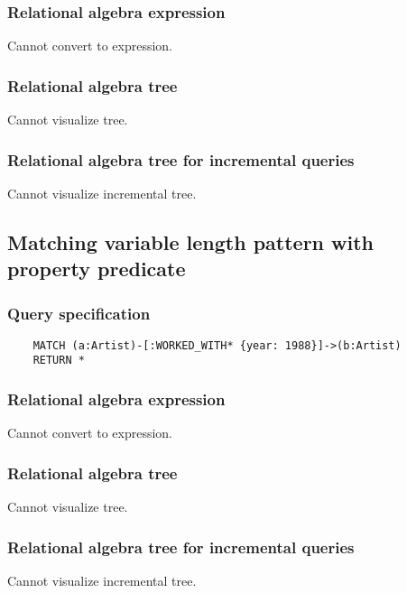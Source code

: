 	\subsubsection*{Relational algebra expression}

	Cannot convert to expression.

	\subsubsection*{Relational algebra tree}

	Cannot visualize tree.

	\subsubsection*{Relational algebra tree for incremental queries}

	Cannot visualize incremental tree.
	\subsection{Matching variable length pattern with property predicate}

	\subsubsection*{Query specification}

	\begin{lstlisting}
	MATCH (a:Artist)-[:WORKED_WITH* {year: 1988}]->(b:Artist)
	RETURN *
	\end{lstlisting}


	\subsubsection*{Relational algebra expression}

	Cannot convert to expression.

	\subsubsection*{Relational algebra tree}

	Cannot visualize tree.

	\subsubsection*{Relational algebra tree for incremental queries}

	Cannot visualize incremental tree.
